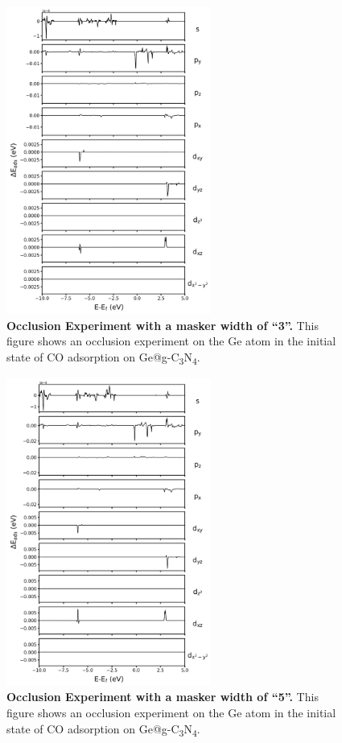 \begin{figure}[htbp]
  \centering
  \includegraphics[width=0.6\textwidth]{supp_fig23_occl_wid3.png}
  \caption{\textbf{Occlusion Experiment with a masker width of ``3''.}
  This figure shows an occlusion experiment on the Ge atom in
  the initial state of CO adsorption on Ge@g-C\textsubscript{3}N\textsubscript{4}.}
  \label{supp_fig23:occl_wid3}
\end{figure}

\begin{figure}[htbp]
  \centering
  \includegraphics[width=0.6\textwidth]{supp_fig24_occl_wid5.png}
  \caption{\textbf{Occlusion Experiment with a masker width of ``5''.}
  This figure shows an occlusion experiment on the Ge atom in
  the initial state of CO adsorption on Ge@g-C\textsubscript{3}N\textsubscript{4}.}
  \label{supp_fig24:occl_wid5}
\end{figure}

